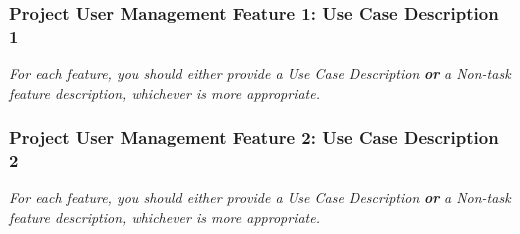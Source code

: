 \documentclass[twoside,letterpaper]{article}
\begin{document}
\newpage

\subsubsection[Project User Management Feature 1: Use Case Description 1]{\rmfamily\bfseries\color{black}
	Project User Management Feature 1: Use Case Description 1}
\hypertarget{RefHeading22059017292}{}
\bigskip

{\color{black}
	\foreignlanguage{english}{\textit{For each feature, you should either provide a Use Case Description
		}}\foreignlanguage{english}{\textbf{\textit{or}}}\foreignlanguage{english}{\textit{ a Non-task feature description,
		whichever is more appropriate.}}}
\newpage

\subsubsection[Project User Management Feature 2: Use Case Description 2]{\rmfamily\bfseries\color{black}
	Project User Management Feature 2: Use Case Description 2}
\hypertarget{RefHeading22059017292}{}
\bigskip

{\color{black}
	\foreignlanguage{english}{\textit{For each feature, you should either provide a Use Case Description
		}}\foreignlanguage{english}{\textbf{\textit{or}}}\foreignlanguage{english}{\textit{ a Non-task feature description,
		whichever is more appropriate.}}}
\newpage
\end{document}
